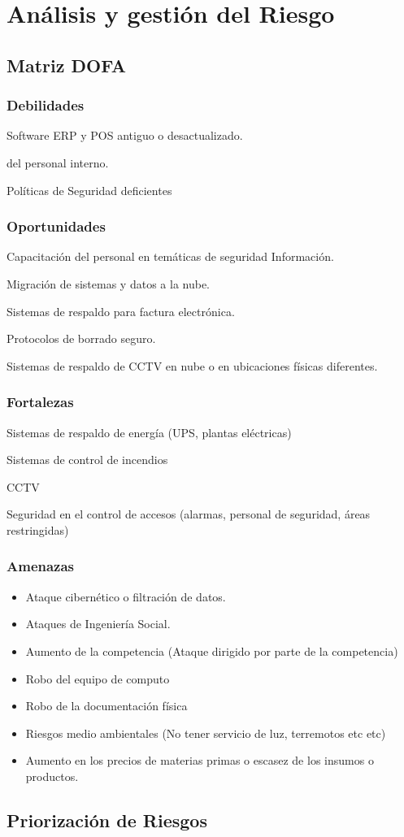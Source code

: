\newpage
{}
\section{\large Análisis y gestión del Riesgo}

\subsection{Matriz DOFA} 

\subsubsection{Debilidades}
\item Software ERP y POS antiguo o desactualizado.
\item  del personal interno.
\item Políticas de Seguridad deficientes

\subsubsection{Oportunidades}
\item Capacitación del personal en temáticas de seguridad Información.
\item Migración de sistemas y datos a la nube.
\item Sistemas de respaldo para factura electrónica.
\item Protocolos de borrado seguro.
\item Sistemas de respaldo de CCTV en nube o en ubicaciones físicas diferentes.

\subsubsection{Fortalezas}
\item Sistemas de respaldo de energía (UPS, plantas eléctricas)
\item Sistemas de control de incendios
\item CCTV
\item Seguridad en el control de accesos (alarmas, personal de seguridad, áreas restringidas)

\subsubsection{Amenazas}
\begin{itemize}
\item Ataque cibernético o filtración de datos.
\item Ataques de Ingeniería Social.
\item Aumento de la competencia (Ataque dirigido por parte de la competencia)
\item Robo del equipo de computo
\item Robo de la documentación física
\item Riesgos medio ambientales (No tener servicio de luz, terremotos etc etc)
\item Aumento en los precios de materias primas o escasez de los insumos o productos.
\end{itemize}

\subsection{Priorización de Riesgos} 